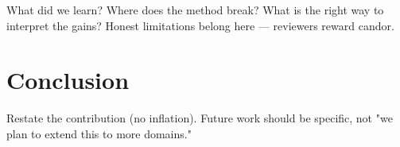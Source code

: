 \documentclass{article}
\begin{document}
What did we learn? Where does the method break? What is the right way to
interpret the gains? Honest limitations belong here — reviewers reward
candor.

\section{Conclusion}
\label{sec:conclusion}

Restate the contribution (no inflation). Future work should be specific,
not "we plan to extend this to more domains."




\end{document}
